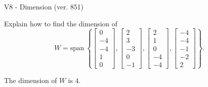 \begin{exercise}
  \begin{exerciseTitle}V8 - Dimension (ver. 851)\end{exerciseTitle}
  \begin{exerciseStatement}
    Explain how to find the dimension of 
\[W=\mathrm{span}\ \left\{\left[\begin{array}{r}
0 \\
-4 \\
-4 \\
1 \\
0
\end{array}\right] , \left[\begin{array}{r}
2 \\
3 \\
-3 \\
0 \\
-1
\end{array}\right] , \left[\begin{array}{r}
2 \\
1 \\
0 \\
-4 \\
-4
\end{array}\right] , \left[\begin{array}{r}
-4 \\
-4 \\
-1 \\
-2 \\
2
\end{array}\right]\right\}.\]



  \end{exerciseStatement}
  \begin{exerciseAnswer}
   The dimension of \(W\) is  \(4\).
  


  \end{exerciseAnswer}
\end{exercise}